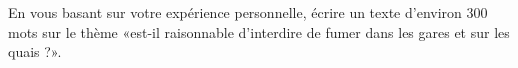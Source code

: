 
\begin{exercice}\label{exosmath-0418}

    En vous basant sur votre expérience personnelle, écrire un texte d'environ \( 300\) mots sur le thème «est-il raisonnable d'interdire de fumer dans les gares et sur les quais ?».

\end{exercice}
